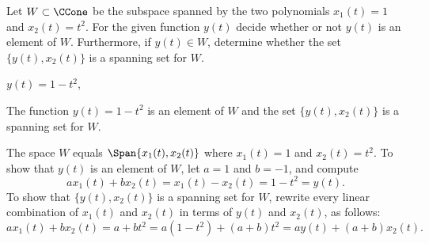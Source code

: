 \documentclass{article}
\begin{document}



\problemlabel

\noindent Let $W\subset\CCone$ be the subspace spanned by the two polynomials $x_1(t) = 1$ and $x_2(t)=t^2$.  For the given function $y(t)$ decide whether or not $y(t)$ is an element of $W$.  Furthermore, if $y(t)\in W$, determine whether the set $\{y(t),x_2(t)\}$ is a spanning set for $W$.

\begin{exercise} \label{c5.2.6a}
$y(t) = 1-t^2$,

\begin{solution}

\ans The function $y(t) = 1 - t^2$ is an element of $W$ and the set
$\{y(t),x_2(t)\}$ is a spanning set for $W$.



\soln The space $W$ equals $\Span\{x_1(t),x_2(t)\}$ where $x_1(t)=1$ and 
$x_2(t)=t^2$.  To show that $y(t)$ is an element of $W$, let
$a = 1$ and $b = -1$, and compute
\[
ax_1(t) + bx_2(t) = x_1(t) - x_2(t) = 1 - t^2 = y(t). 
\]
To show that $\{y(t),x_2(t)\}$ is a spanning set for $W$, rewrite every
linear combination of $x_1(t)$ and $x_2(t)$ in terms of $y(t)$ and $x_2(t)$, 
as follows:
\[ 
ax_1(t) + bx_2(t) = a + bt^2 = a(1 - t^2) + (a + b)t^2
= ay(t) + (a + b)x_2(t). 
\]

\end{solution}
\end{exercise}





\problemlabel
\end{document}
